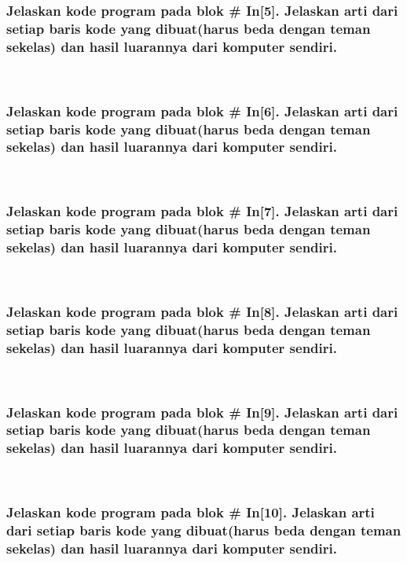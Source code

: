  
 
\subsubsection{Jelaskan kode program pada blok \# In[5]. Jelaskan arti dari setiap baris kode yang dibuat(harus beda dengan teman sekelas) dan hasil luarannya dari komputer sendiri.}
	\hfill\\
 	 
\subsubsection{Jelaskan kode program pada blok \# In[6]. Jelaskan arti dari setiap baris kode yang dibuat(harus beda dengan teman sekelas) dan hasil luarannya dari komputer sendiri.}
	\hfill\\
	
\subsubsection{Jelaskan kode program pada blok \# In[7]. Jelaskan arti dari setiap baris kode yang dibuat(harus beda dengan teman sekelas) dan hasil luarannya dari komputer sendiri.}
	\hfill\\

\subsubsection{Jelaskan kode program pada blok \# In[8]. Jelaskan arti dari setiap baris kode yang dibuat(harus beda dengan teman sekelas) dan hasil luarannya dari komputer sendiri.}

	\hfill\\
 
\subsubsection{Jelaskan kode program pada blok \# In[9]. Jelaskan arti dari setiap baris kode yang dibuat(harus beda dengan teman sekelas) dan hasil luarannya dari komputer sendiri.}
	\hfill\\

\subsubsection{Jelaskan kode program pada blok \# In[10]. Jelaskan arti dari setiap baris kode yang dibuat(harus beda dengan teman sekelas) dan hasil luarannya dari komputer sendiri.}
	\hfill\\
	
